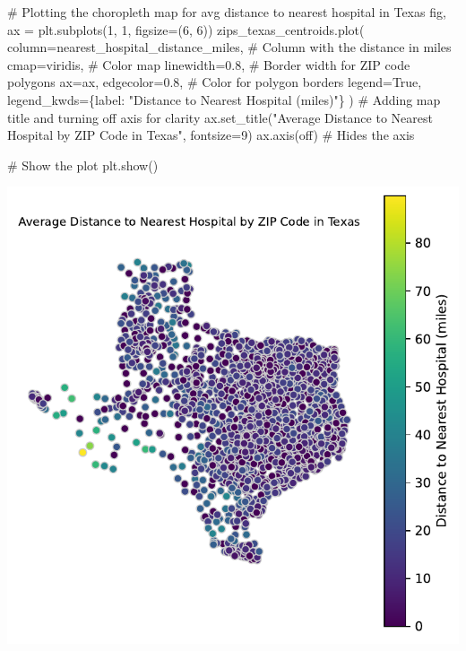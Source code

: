 \documentclass[
  letterpaper,
  DIV=11,
  numbers=noendperiod]{scrartcl}
\newenvironment{Shaded}{\begin{snugshade}}{\end{snugshade}}
\newcommand{\CommentTok}[1]{\textcolor[rgb]{0.37,0.37,0.37}{#1}}
\newcommand{\DecValTok}[1]{\textcolor[rgb]{0.68,0.00,0.00}{#1}}
\newcommand{\FloatTok}[1]{\textcolor[rgb]{0.68,0.00,0.00}{#1}}
\newcommand{\NormalTok}[1]{\textcolor[rgb]{0.00,0.23,0.31}{#1}}
\newcommand{\OperatorTok}[1]{\textcolor[rgb]{0.37,0.37,0.37}{#1}}
\newcommand{\StringTok}[1]{\textcolor[rgb]{0.13,0.47,0.30}{#1}}
\newcommand{\VariableTok}[1]{\textcolor[rgb]{0.07,0.07,0.07}{#1}}
\begin{document}
\begin{Shaded}
\begin{Highlighting}[]
\CommentTok{\# Plotting the choropleth map for avg distance to nearest hospital in Texas}
\NormalTok{fig, ax }\OperatorTok{=}\NormalTok{ plt.subplots(}\DecValTok{1}\NormalTok{, }\DecValTok{1}\NormalTok{, figsize}\OperatorTok{=}\NormalTok{(}\DecValTok{6}\NormalTok{, }\DecValTok{6}\NormalTok{))}
\NormalTok{zips\_texas\_centroids.plot(}
\NormalTok{    column}\OperatorTok{=}\StringTok{\textquotesingle{}nearest\_hospital\_distance\_miles\textquotesingle{}}\NormalTok{,  }\CommentTok{\# Column with the distance in miles}
\NormalTok{    cmap}\OperatorTok{=}\StringTok{\textquotesingle{}viridis\textquotesingle{}}\NormalTok{,                            }\CommentTok{\# Color map}
\NormalTok{    linewidth}\OperatorTok{=}\FloatTok{0.8}\NormalTok{,                             }\CommentTok{\# Border width for ZIP code polygons}
\NormalTok{    ax}\OperatorTok{=}\NormalTok{ax,}
\NormalTok{    edgecolor}\OperatorTok{=}\StringTok{\textquotesingle{}0.8\textquotesingle{}}\NormalTok{,                           }\CommentTok{\# Color for polygon borders}
\NormalTok{    legend}\OperatorTok{=}\VariableTok{True}\NormalTok{,}
\NormalTok{    legend\_kwds}\OperatorTok{=}\NormalTok{\{}\StringTok{\textquotesingle{}label\textquotesingle{}}\NormalTok{: }\StringTok{"Distance to Nearest Hospital (miles)"}\NormalTok{\}}
\NormalTok{)}
\CommentTok{\# Adding map title and turning off axis for clarity}
\NormalTok{ax.set\_title(}\StringTok{"Average Distance to Nearest Hospital by ZIP Code in Texas"}\NormalTok{, fontsize}\OperatorTok{=}\DecValTok{9}\NormalTok{)}
\NormalTok{ax.axis(}\StringTok{\textquotesingle{}off\textquotesingle{}}\NormalTok{)  }\CommentTok{\# Hides the axis}

\CommentTok{\# Show the plot}
\NormalTok{plt.show()}
\end{Highlighting}
\end{Shaded}

\includegraphics{pset4_template_files/figure-pdf/cell-22-output-1.pdf}
\end{document}
